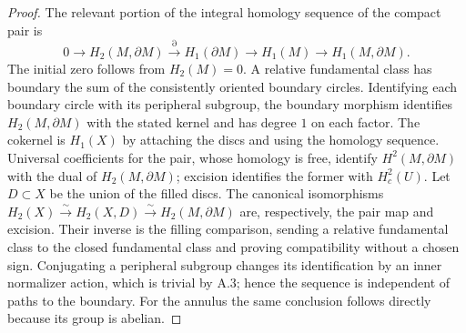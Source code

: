 \begin{proof}
The relevant portion of the integral homology sequence of the compact pair is
\[
0\to H_2(M,\partial M)\xrightarrow{\partial}
H_1(\partial M)\to H_1(M)\to H_1(M,\partial M).
\]
The initial zero follows from $H_2(M)=0$. A relative fundamental class has boundary the sum of the consistently oriented boundary circles. Identifying each boundary circle with its peripheral subgroup, the boundary morphism identifies $H_2(M,\partial M)$ with the stated kernel and has degree $1$ on each factor. The cokernel is $H_1(X)$ by attaching the discs and using the homology sequence. Universal coefficients for the pair, whose homology is free, identify $H^2(M,\partial M)$ with the dual of $H_2(M,\partial M)$; excision identifies the former with $H^2_c(U)$. Let $D\subset X$ be the union of the filled discs. The canonical isomorphisms $H_2(X)\xrightarrow{\sim}H_2(X,D)\xrightarrow{\sim}H_2(M,\partial M)$ are, respectively, the pair map and excision. Their inverse is the filling comparison, sending a relative fundamental class to the closed fundamental class and proving compatibility without a chosen sign. Conjugating a peripheral subgroup changes its identification by an inner normalizer action, which is trivial by A.3; hence the sequence is independent of paths to the boundary. For the annulus the same conclusion follows directly because its group is abelian.


\end{proof}
